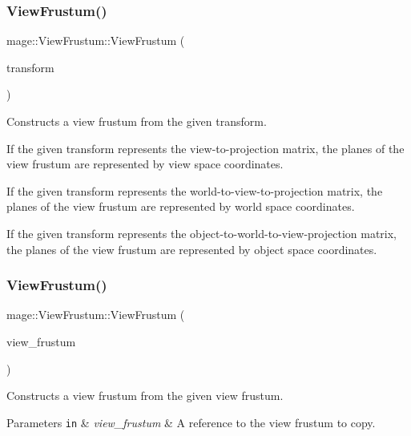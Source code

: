 \subsubsection{\texorpdfstring{View\+Frustum()}{ViewFrustum()}\hspace{0.1cm}{\footnotesize\ttfamily [1/3]}}
{\footnotesize\ttfamily mage\+::\+View\+Frustum\+::\+View\+Frustum (\begin{DoxyParamCaption}\item[{C\+X\+M\+M\+A\+T\+R\+IX}]{transform }\end{DoxyParamCaption})\hspace{0.3cm}{\ttfamily [explicit]}}

Constructs a view frustum from the given transform.

If the given transform represents the view-\/to-\/projection matrix, the planes of the view frustum are represented by view space coordinates.

If the given transform represents the world-\/to-\/view-\/to-\/projection matrix, the planes of the view frustum are represented by world space coordinates.

If the given transform represents the object-\/to-\/world-\/to-\/view-\/projection matrix, the planes of the view frustum are represented by object space coordinates. \hypertarget{structmage_1_1_view_frustum_abbd4ec6c2766d3f630bce16cefa8bc4d}{}\label{structmage_1_1_view_frustum_abbd4ec6c2766d3f630bce16cefa8bc4d} 
\subsubsection{\texorpdfstring{View\+Frustum()}{ViewFrustum()}\hspace{0.1cm}{\footnotesize\ttfamily [2/3]}}
{\footnotesize\ttfamily mage\+::\+View\+Frustum\+::\+View\+Frustum (\begin{DoxyParamCaption}\item[{const \hyperlink{structmage_1_1_view_frustum}{View\+Frustum} \&}]{view\+\_\+frustum }\end{DoxyParamCaption})\hspace{0.3cm}{\ttfamily [default]}}

Constructs a view frustum from the given view frustum.


\begin{DoxyParams}[1]{Parameters}
\mbox{\tt in}  & {\em view\+\_\+frustum} & A reference to the view frustum to copy. \\
\hline
\end{DoxyParams}
\hypertarget{structmage_1_1_view_frustum_a3568cfa6a5d440455867eb11b88a5213}{}\label{structmage_1_1_view_frustum_a3568cfa6a5d440455867eb11b88a5213} 
